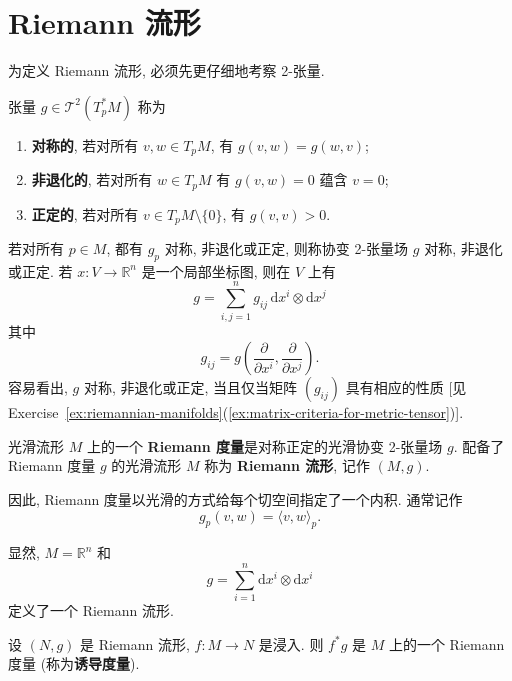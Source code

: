 \section{Riemann 流形}\label{sec:riemannian-metrics}

为定义 Riemann 流形, 必须先更仔细地考察 2-张量.

\begin{RiemannDefinition}\label{def:symmetric-nondegenerate-positive-tensor}
张量 $g\in\mathcal{T}^2(T_p^*M)$ 称为
\begin{enumerate}[label=(\roman*),leftmargin=*]
\item \textbf{对称的}, 若对所有 $v,w\in T_pM$, 有 $g(v,w)=g(w,v)$;
\item \textbf{非退化的}, 若对所有 $w\in T_pM$ 有 $g(v,w)=0$ 蕴含 $v=0$;
\item \textbf{正定的}, 若对所有 $v\in T_pM\setminus\{0\}$, 有 $g(v,v)>0$.
\end{enumerate}
\end{RiemannDefinition}

若对所有 $p\in M$, 都有 $g_p$ 对称, 非退化或正定, 则称协变 2-张量场 $g$ 对称, 非退化或正定. 若 $x:V\to\mathbb{R}^n$ 是一个局部坐标图, 则在 $V$ 上有
\[
  g=\sum_{i,j=1}^n g_{ij}\,\mathrm{d}x^i\otimes\mathrm{d}x^j
\]
其中
\[
  g_{ij}=g\left(\frac{\partial}{\partial x^i},\frac{\partial}{\partial x^j}\right).
\]
容易看出, $g$ 对称, 非退化或正定, 当且仅当矩阵 $(g_{ij})$ 具有相应的性质 [见 Exercise~\ref{ex:riemannian-manifolds}(\ref{ex:matrix-criteria-for-metric-tensor})].

\begin{RiemannDefinition}\label{def:riemannian-metric-and-manifold}
光滑流形 $M$ 上的一个 \textbf{Riemann 度量}是对称正定的光滑协变 2-张量场 $g$. 配备了 Riemann 度量 $g$ 的光滑流形 $M$ 称为 \textbf{Riemann 流形}, 记作 $(M,g)$.
\end{RiemannDefinition}

因此, Riemann 度量以光滑的方式给每个切空间指定了一个内积. 通常记作
\[
  g_p(v,w)=\langle v,w\rangle_p.
\]

\begin{RiemannExample}\label{ex:euclidean-metric}
显然, $M=\mathbb{R}^n$ 和
\[
  g=\sum_{i=1}^n\mathrm{d}x^i\otimes\mathrm{d}x^i
\]
定义了一个 Riemann 流形.
\end{RiemannExample}

\begin{RiemannProposition}\label{prop:induced-metric-of-immersion}
设 $(N,g)$ 是 Riemann 流形, $f:M\to N$ 是浸入. 则 $f^*g$ 是 $M$ 上的一个 Riemann 度量 (称为\textbf{诱导度量}).
\end{RiemannProposition}

